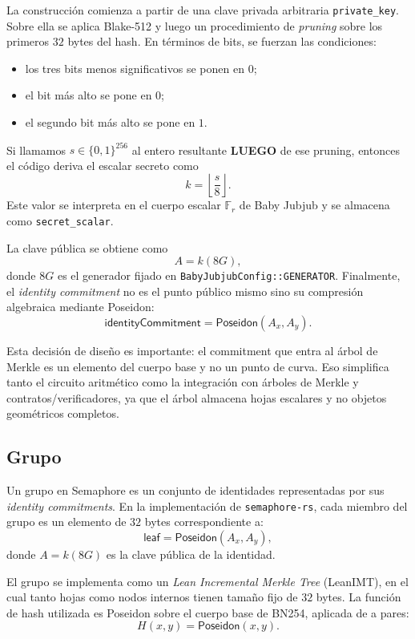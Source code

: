 \documentclass[11pt,a4paper]{article}
\begin{document}
	La construcción comienza a partir de una clave privada arbitraria \texttt{private\_key}. Sobre ella se aplica Blake-512 y luego un procedimiento de \emph{pruning} sobre los primeros $32$ bytes del hash. En términos de bits, se fuerzan las condiciones:
	\begin{itemize}
		\item los tres bits menos significativos se ponen en $0$;
		\item el bit más alto se pone en $0$;
		\item el segundo bit más alto se pone en $1$.
	\end{itemize}
	Si llamamos $s \in \{0,1\}^{256}$ al entero resultante \textbf{LUEGO} de ese pruning, entonces el código deriva el escalar secreto como
	\[
	k = \left\lfloor \frac{s}{8} \right\rfloor.
	\]
	Este valor se interpreta en el cuerpo escalar $\mathbb{F}_r$ de Baby Jubjub y se almacena como \texttt{secret\_scalar}.
	
	La clave pública se obtiene como
	\[
	A = k(8G),
	\]
	donde $8G$ es el generador fijado en \texttt{BabyJubjubConfig::GENERATOR}. Finalmente, el \emph{identity commitment} no es el punto público mismo sino su compresión algebraica mediante Poseidon:
	\[
	\mathsf{identityCommitment} = \mathsf{Poseidon}(A_x, A_y).
	\]
	
	Esta decisión de diseño es importante: el commitment que entra al árbol de Merkle es un elemento del cuerpo base y no un punto de curva. Eso simplifica tanto el circuito aritmético como la integración con árboles de Merkle y contratos/verificadores, ya que el árbol almacena hojas escalares y no objetos geométricos completos.
	
	\subsection{Grupo}
	
	Un grupo en Semaphore es un conjunto de identidades representadas por sus \emph{identity commitments}. En la implementación de \texttt{semaphore-rs}, cada miembro del grupo es un elemento de $32$ bytes correspondiente a:
	\[
	\mathsf{leaf} = \mathsf{Poseidon}(A_x, A_y),
	\]
	donde $A = k(8G)$ es la clave pública de la identidad.
	
	El grupo se implementa como un \emph{Lean Incremental Merkle Tree} (LeanIMT), en el cual tanto hojas como nodos internos tienen tamaño fijo de $32$ bytes. La función de hash utilizada es Poseidon sobre el cuerpo base de BN254, aplicada de a pares:
	\[
	H(x,y) = \mathsf{Poseidon}(x,y).
	\]
	
\end{document}
